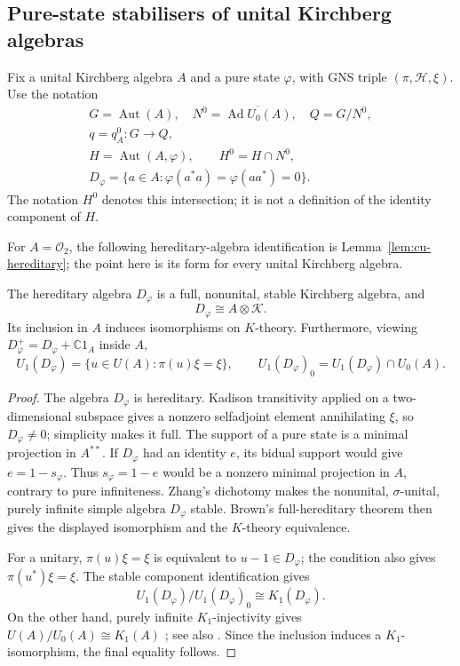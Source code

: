 \subsection{Pure-state stabilisers of unital Kirchberg algebras}
\label{sec:un-kirchberg-stabilizer}

Fix a unital Kirchberg algebra \(A\) and a pure state \(\varphi\), with
GNS triple \((\pi,\mathcal H,\xi)\). Use the notation
\[
 \begin{gathered}
 G=\operatorname{Aut}(A),\quad N^0=\overline{\operatorname{Ad} U_0(A)},\quad Q=G/N^0,\\
 q=q_A^0:G\longrightarrow Q,\\
 H=\operatorname{Aut}(A,\varphi),\qquad H^0=H\cap N^0,\\
 D_\varphi=\{a\in A:\varphi(a^*a)=\varphi(aa^*)=0\}.
 \end{gathered}
\]
The notation \(H^0\) denotes this intersection; it is not a definition
of the identity component of \(H\).

For \(A=\mathcal O_2\), the following hereditary-algebra identification
is Lemma~\ref{lem:cu-hereditary}; the point here is its form for every
unital Kirchberg algebra.

\begin{lemma}\label{lem:un-hereditary}
The hereditary algebra \(D_\varphi\) is a full, nonunital, stable
Kirchberg algebra, and
\[
 D_\varphi\cong A\otimes\mathcal K.
\]
Its inclusion in \(A\) induces isomorphisms on \(K\)-theory.
Furthermore, viewing \(D_\varphi^+=D_\varphi+\mathbb C1_A\) inside \(A\),
\[
 U_1(D_\varphi)
   =\{u\in U(A):\pi(u)\xi=\xi\},\qquad
 U_1(D_\varphi)_0=U_1(D_\varphi)\cap U_0(A).
\]
\end{lemma}
\begin{proof}
The algebra \(D_\varphi\) is hereditary. Kadison transitivity applied
on a two-dimensional subspace gives a nonzero selfadjoint element
annihilating \(\xi\), so \(D_\varphi\neq0\); simplicity makes it full.
The support of a pure state is a minimal projection in \(A^{**}\).
If \(D_\varphi\) had an identity \(e\), its bidual support would give
\(e=1-s_\varphi\). Thus \(s_\varphi=1-e\) would be a nonzero minimal
projection in \(A\), contrary to pure infiniteness.
Zhang's dichotomy \cite[Theorem 1.2]{Zhang1992} makes the nonunital,
\(\sigma\)-unital, purely infinite simple algebra \(D_\varphi\) stable.
Brown's full-hereditary theorem \cite[Theorem 2.8]{Brown1977} then gives
the displayed isomorphism and the \(K\)-theory equivalence.

For a unitary, \(\pi(u)\xi=\xi\) is equivalent to
\(u-1\in D_\varphi\); the condition also gives \(\pi(u^*)\xi=\xi\).
The stable component identification gives
\[
 U_1(D_\varphi)/U_1(D_\varphi)_0\cong K_1(D_\varphi).
\]
On the other hand, purely infinite \(K_1\)-injectivity gives
\(U(A)/U_0(A)\cong K_1(A)\) \cite{Cuntz1981}; see also \cite[Proposition~8.1.4]{Blackadar1998}.
Since the inclusion induces a \(K_1\)-isomorphism, the final equality
follows.
\end{proof}

